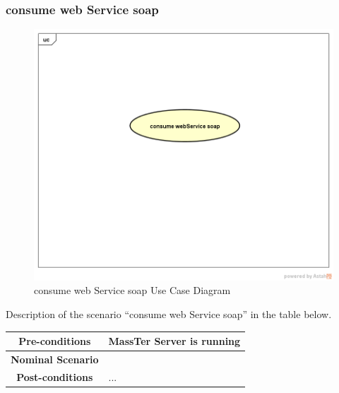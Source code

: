 \documentclass[12pt]{article}
\begin{document}
 \clearpage
 \newpage
	 \subsubsection{consume web Service soap}
	 	 	\begin{figure}[h]
	 	\centering
	 	\includegraphics[width=1.0\textwidth]{consumewebServicesoap.png}
	 	\caption{consume web Service soap Use Case Diagram}
	 	
	 \end{figure}
 Description of the scenario ``consume web Service soap'' in the table below.
  \begin{table}
 	\centering
 	\begin{tabular}{|c|p{10cm}|}
 		\hline 	
 		\textbf{Pre-conditions } & MassTer Server is running  \\ 
 		\hline                     
 		\textbf{Nominal Scenario } & \\ 
 		\hline 
 		\textbf{Post-conditions} & ... \\
 		\hline 
 	\end{tabular}
 \end{table}
 \clearpage
 \newpage
\end{document}
